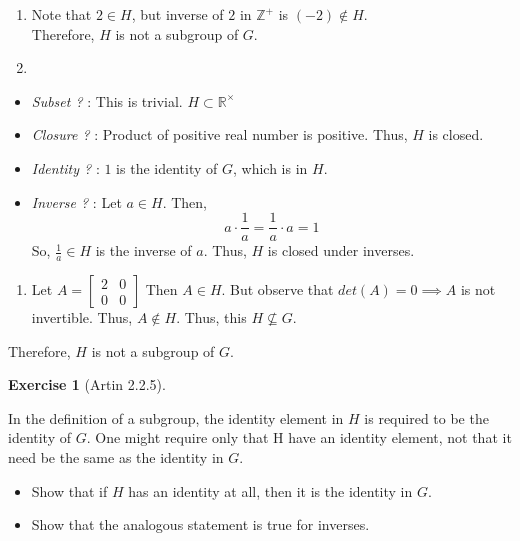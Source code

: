 \documentclass[
]{book}
\providecommand{\tightlist}{%
  \setlength{\itemsep}{0pt}\setlength{\parskip}{0pt}}
\theoremstyle{definition}
\theoremstyle{definition}
\theoremstyle{definition}
\newtheorem{exercise}{Exercise}[chapter]
\theoremstyle{definition}
\theoremstyle{remark}
\begin{document}
\begin{enumerate}
\def\labelenumi{(\alph{enumi})}
\setcounter{enumi}{2}
\item
  Note that \(2\in H\), but inverse of \(2\) in \(\mathbb{Z}^+\) is \((-2) \not \in H\).\\
  Therefore, \(H\) is not a subgroup of \(G\).
\item
\end{enumerate}

\begin{itemize}
\item
  \emph{Subset ?} : This is trivial. \(H \subset \mathbb{R}^\times\)
\item
  \emph{Closure ?} : Product of positive real number is positive. Thus, \(H\) is closed.
\item
  \emph{Identity ?} : \(1\) is the identity of \(G\), which is in \(H\).
\item
  \emph{Inverse ?} : Let \(a\in H\). Then,
  \[a\cdot \frac{1}{a}=\frac{1}{a}\cdot a=1\]
  So, \(\frac{1}{a}\in H\) is the inverse of \(a\). Thus, \(H\) is closed under inverses.
\end{itemize}

\begin{enumerate}
\def\labelenumi{(\alph{enumi})}
\setcounter{enumi}{4}
\tightlist
\item
  Let \(A=\begin{bmatrix} 2 & 0 \\ 0 & 0 \end{bmatrix}\) Then \(A\in H\). But observe that \(det(A)=0\implies A\) is not invertible. Thus, \(A\not\in H\). Thus, this \(H \not\subseteq G\).
\end{enumerate}

Therefore, \(H\) is not a subgroup of \(G\).

\begin{exercise}[Artin 2.2.5]
\protect\hypertarget{exr:unnamed-chunk-74}{}\label{exr:unnamed-chunk-74}

In the definition of a subgroup, the identity element in \(H\) is required to be the identity
of \(G\). One might require only that H have an identity element, not that it need be the
same as the identity in \(G\).

\begin{itemize}
\tightlist
\item
  Show that if \(H\) has an identity at all, then it is the identity in \(G\).
\item
  Show that the analogous statement is true for inverses.
\end{itemize}

\end{exercise}
\end{document}
